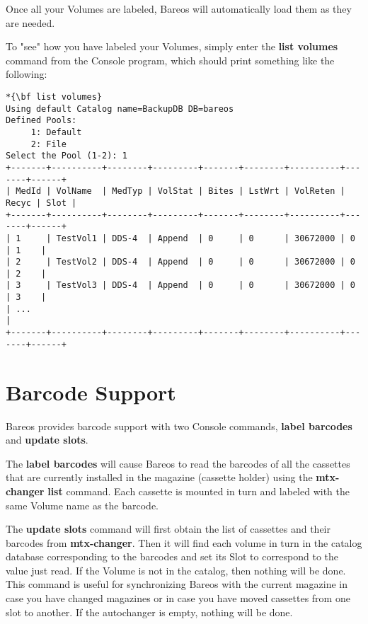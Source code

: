 Once all your Volumes are labeled, Bareos will automatically load them as they
are needed.

To "see" how you have labeled your Volumes, simply enter the {\bf list
volumes} command from the Console program, which should print something like
the following:

\footnotesize
\begin{verbatim}
*{\bf list volumes}
Using default Catalog name=BackupDB DB=bareos
Defined Pools:
     1: Default
     2: File
Select the Pool (1-2): 1
+-------+----------+--------+---------+-------+--------+----------+-------+------+
| MedId | VolName  | MedTyp | VolStat | Bites | LstWrt | VolReten | Recyc | Slot |
+-------+----------+--------+---------+-------+--------+----------+-------+------+
| 1     | TestVol1 | DDS-4  | Append  | 0     | 0      | 30672000 | 0     | 1    |
| 2     | TestVol2 | DDS-4  | Append  | 0     | 0      | 30672000 | 0     | 2    |
| 3     | TestVol3 | DDS-4  | Append  | 0     | 0      | 30672000 | 0     | 3    |
| ...                                                                            |
+-------+----------+--------+---------+-------+--------+----------+-------+------+
\end{verbatim}
\normalsize



\section{Barcode Support}
\label{Barcodes}

Bareos provides barcode support with two Console commands, {\bf label
barcodes} and {\bf update slots}.

The {\bf label barcodes} will cause Bareos to read the barcodes of all the
cassettes that are currently installed in the magazine (cassette holder) using
the {\bf mtx-changer} {\bf list} command. Each cassette is mounted in turn and
labeled with the same Volume name as the barcode.

The {\bf update slots} command will first obtain the list of cassettes and
their barcodes from {\bf mtx-changer}. Then it will find each volume in turn
in the catalog database corresponding to the barcodes and set its Slot to
correspond to the value just read. If the Volume is not in the catalog, then
nothing will be done. This command is useful for synchronizing Bareos with the
current magazine in case you have changed magazines or in case you have moved
cassettes from one slot to another. If the autochanger is empty, nothing will
be done.

